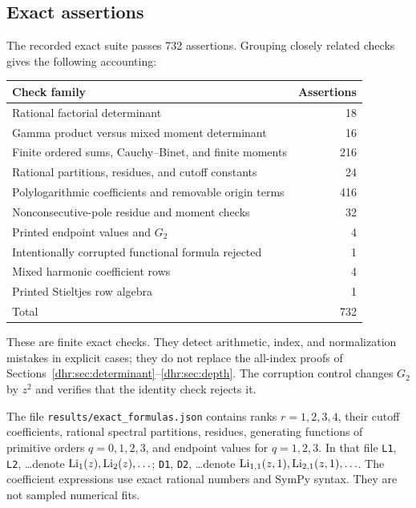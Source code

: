 \subsection{Exact assertions}
The recorded exact suite passes 732 assertions. Grouping closely
related checks gives the following accounting:
\begin{center}
\small
\begin{tabular}{lr}
\toprule
Check family & Assertions\\
\midrule
Rational factorial determinant & 18\\
Gamma product versus mixed moment determinant & 16\\
Finite ordered sums, Cauchy--Binet, and finite moments & 216\\
Rational partitions, residues, and cutoff constants & 24\\
Polylogarithmic coefficients and removable origin terms & 416\\
Nonconsecutive-pole residue and moment checks & 32\\
Printed endpoint values and $G_2$ & 4\\
Intentionally corrupted functional formula rejected & 1\\
Mixed harmonic coefficient rows & 4\\
Printed Stieltjes row algebra & 1\\
\midrule
Total & 732\\
\bottomrule
\end{tabular}
\end{center}
These are finite exact checks. They detect arithmetic, index, and
normalization mistakes in explicit cases; they do not replace the
all-index proofs of Sections~\ref{dhr:sec:determinant}--\ref{dhr:sec:depth}.
The corruption control changes $G_2$ by $z^2$ and verifies that the
identity check rejects it.

The file \texttt{results/exact\_formulas.json} contains ranks
$r=1,2,3,4$, their cutoff coefficients, rational spectral partitions,
residues, generating functions of primitive orders $q=0,1,2,3$, and
endpoint values for $q=1,2,3$. In that file \texttt{L1}, \texttt{L2},
\ldots denote $\operatorname{Li}_1(z),\operatorname{Li}_2(z),\ldots$; \texttt{D1}, \texttt{D2},
\ldots denote $\operatorname{Li}_{1,1}(z,1),\operatorname{Li}_{2,1}(z,1),\ldots$.
The coefficient expressions use exact rational numbers and SymPy
syntax. They are not sampled numerical fits.

